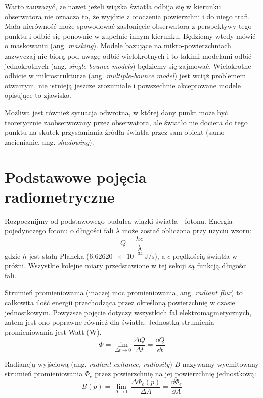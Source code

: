 \documentclass[../main.tex]{subfiles}
\begin{document}
Warto zauważyć, że nawet jeżeli wiązka światła odbija się w kierunku obserwatora nie oznacza to, że wyjdzie z otoczenia powierzchni i do niego trafi. Mała nierówność może spowodować zasłonięcie obserwatora z perspektywy tego punktu i odbić się ponownie w zupełnie innym kierunku. Będziemy wtedy mówić o maskowaniu (ang. \textit{masking}). Modele bazujące na mikro-powierzchniach zazwyczaj nie biorą pod uwagę odbić wielokrotnych i to takimi modelami odbić jednokrotnych (ang. \textit{single-bounce models}) będziemy się zajmować. Wielokrotne odbicie w mikrostrukturze (ang. \textit{multiple-bounce model}) jest wciąż problemem otwartym, nie istnieją jeszcze zrozumiałe i powszechnie akceptowane modele opisujące to zjawisko.

Możliwa jest również sytuacja odwrotna, w której dany punkt może być teoretycznie zaobserwowany przez obserwatora, ale światło nie dociera do tego punktu na skutek przysłaniania źródła światła przez sam obiekt (samo-zacienianie, ang. \textit{shadowing}).


\section{Podstawowe pojęcia radiometryczne}

Rozpocznijmy od podstawowego budulca wiązki światła - fotonu. Energia pojedynczego fotonu o długości fali $\lambda$ może zostać obliczona przy użyciu wzoru:
\[ 
    Q = \frac{hc}{\lambda} 
\]
\noindent gdzie $h$ jest stałą Plancka ($\SI{6.62620e-34}{\joule\per\second}$), a $c$ prędkością światła w próżni. Wszystkie kolejne miary przedstawione w tej sekcji są funkcją długości fali.

Strumień promieniowania (inaczej moc promieniowania, ang. \textit{radiant flux}) to całkowita ilość energii przechodząca przez określoną powierzchnię w czasie jednostkowym. Powyższe pojęcie dotyczy wszystkich fal elektromagmetycznych, zatem jest ono poprawne również dla światła. Jednostką strumienia promieniowania jest Watt ($\si{\watt}$).
\[
\Phi = 
    \lim_{\Delta t \rightarrow 0}{
        \frac{\Delta Q}{\Delta t}
    } 
    = \frac{\dd Q}{\dd t}
\]

Radiancją wyjściową (ang. \textit{radiant exitance, radiosity}) $B$ nazywamy wyemitowany strumień promieniowania $\Phi_{e}$ przez powierzchnię na jej powierzchnię jednostkową:
\[
B(p) = 
    \lim_{\Delta \rightarrow 0}{
        \frac{\Delta \Phi_{e}(p)}{\Delta A}
    } 
    = \frac{\dd \Phi_{e}}{\dd A}
\]  
\end{document}
